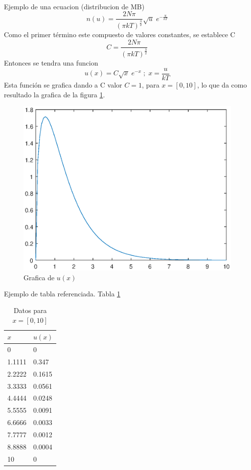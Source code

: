 \documentclass[12pt]{article}
\begin{document}
\paragraph{} Ejemplo de una ecuacion (distribucion de MB)
\begin{equation}
    n(u) = \frac{2N\pi}{\left(\pi kT\right)^{\frac{3}{2}}} \sqrt{u} \; e^{-\frac{u}{kT}}
\end{equation}
Como el primer término este compuesto de valores constantes, se establece C 
\begin{equation*}
    C =  \frac{2N\pi}{\left(\pi kT\right)^{\frac{3}{2}}}
\end{equation*}
Entonces se tendra una funcion 
\begin{equation*}
    u(x) = C\sqrt{x}\; e^{-x} \; ; \; x = \frac{u}{kT}
\end{equation*}
Esta función se grafica dando a C valor $C = 1$, para $x = [0,10]$, 
lo que da como resultado la grafica de la figura \ref{fig1}. 
\begin{figure}[h]
    \centering
    \includegraphics[scale = 0.5]{grafica.eps}
    \caption{Grafica de $u(x)$}
    \label{fig1}
\end{figure} 
\newpage
Ejemplo de tabla referenciada. Tabla \ref{tab1}
    \begin{table}[h]
        \centering
        \begin{tabular}{@{}ll@{}}
        \toprule
        $x$    & $u(x)$ \\ \midrule
        0      & 0      \\
        1.1111 & 0.347  \\
        2.2222 & 0.1615 \\
        3.3333 & 0.0561 \\
        4.4444 & 0.0248 \\
        5.5555 & 0.0091 \\
        6.6666 & 0.0033 \\
        7.7777 & 0.0012 \\
        8.8888 & 0.0004 \\
        10     & 0      \\ \bottomrule
        \end{tabular}
        \caption{Datos para $x = [0,10]$}
        \label{tab1}
        \end{table}
        
\end{document}
